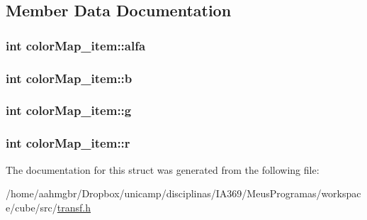 \subsection{Member Data Documentation}
\hypertarget{structcolorMap__item_ad487f4e8f4084352134028ad15c666df}{
\subsubsection[{alfa}]{\setlength{\rightskip}{0pt plus 5cm}int {\bf colorMap\_\-item::alfa}}}
\label{structcolorMap__item_ad487f4e8f4084352134028ad15c666df}
\hypertarget{structcolorMap__item_a00afd487beb2d02973ab14245f82bd9b}{
\subsubsection[{b}]{\setlength{\rightskip}{0pt plus 5cm}int {\bf colorMap\_\-item::b}}}
\label{structcolorMap__item_a00afd487beb2d02973ab14245f82bd9b}
\hypertarget{structcolorMap__item_aced65d1d505d181eb5e553afd5713155}{
\subsubsection[{g}]{\setlength{\rightskip}{0pt plus 5cm}int {\bf colorMap\_\-item::g}}}
\label{structcolorMap__item_aced65d1d505d181eb5e553afd5713155}
\hypertarget{structcolorMap__item_a3311c0394d61bb9b970152d46e323a32}{
\subsubsection[{r}]{\setlength{\rightskip}{0pt plus 5cm}int {\bf colorMap\_\-item::r}}}
\label{structcolorMap__item_a3311c0394d61bb9b970152d46e323a32}


The documentation for this struct was generated from the following file:\begin{DoxyCompactItemize}
\item 
/home/aahmgbr/Dropbox/unicamp/disciplinas/IA369/MeusProgramas/workspace/cube/src/\hyperlink{transf_8h}{transf.h}\end{DoxyCompactItemize}

